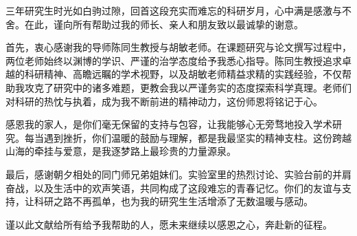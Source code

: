 \begin{ack}
三年研究生时光如白驹过隙，回首这段充实而难忘的科研岁月，心中满是感激与不舍。在此，谨向所有帮助过我的师长、亲人和朋友致以最诚挚的谢意。

首先，衷心感谢我的导师陈同生教授与胡敏老师。在课题研究与论文撰写过程中，两位老师始终以渊博的学识、严谨的治学态度给予我悉心指导。陈同生教授追求卓越的科研精神、高瞻远瞩的学术视野，以及胡敏老师精益求精的实践经验，不仅帮助我攻克了研究中的诸多难题，更教会我以严谨务实的态度探索科学真理。老师们对科研的热忱与执着，成为我不断前进的精神动力，这份师恩将铭记于心。

感恩我的家人，是你们毫无保留的支持与包容，让我能够心无旁骛地投入学术研究。每当遇到挫折，你们温暖的鼓励与理解，都是我最坚实的精神支柱。这份跨越山海的牵挂与爱意，是我逐梦路上最珍贵的力量源泉。

最后，感谢朝夕相处的同门师兄弟姐妹们。实验室里的热烈讨论、实验台前的并肩奋战，以及生活中的欢声笑语，共同构成了这段难忘的青春记忆。你们的友谊与支持，让科研之路不再孤单，也为我的研究生生活增添了无数温暖与感动。

谨以此文献给所有给予我帮助的人，愿未来继续以感恩之心，奔赴新的征程。
\end{ack}
